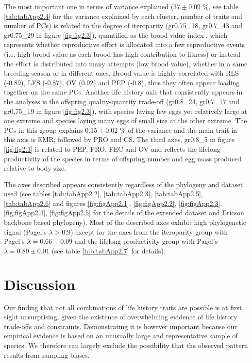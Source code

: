The most important one in terms of variance explained ($37 \pm 0.09$ \%, see
table \ref{tab:tabApp2.4} for the variance explained by each cluster, number
of traits and number of PCs) is related to the degree of iteroparity
(gr0.75\_18, gr0.7\_43 and gr0.75\_29 in figure \ref{fig:fig2.3}), quantified as
the brood value index \citep{Bokony2009}⁠, which represents whether reproductive
effort is allocated into a few reproductive events (i.e. high brood value as
each brood has high contribution to fitness) or instead the effort is
distributed into many attempts (low brood value), whether in a same breeding
season or in different ones. Brood value is highly correlated with RLS (-0.89),
LFS (-0.87), OV (0.92) and PEP (-0.8), thus they often appear loading
together on the same PCs.
Another life history axis that consistently appears in the analyses is the
offspring quality-quantity trade-off (gr0.8\_24, gr0.7\_17 and gr0.75\_19
in figure \ref{fig:fig2.3}), with species laying few eggs yet relatively large
at one extreme and species laying many eggs of small size at the other extreme.
The PCs in this group explains $0.15 \pm 0.02$ \% of the variance and the main
trait in this axis is EMR, followed by PRO and CS.
The third axes, gr0.8\_5 in figure \ref{fig:fig2.3} is related to PEP, PRO, FEC
and OV and reflects the lifelong productivity of the species in terms of
offspring number and egg mass produced relative to body size.

The axes described appears consistently regardless of the phylogeny and dataset
used (see tables \ref{tab:tabApp2.2}, \ref{tab:tabApp2.3}, \ref{tab:tabApp2.5},
\ref{tab:tabApp2.6} and figures \ref{fig:figApp2.1}, \ref{fig:figApp2.2},
\ref{fig:figApp2.3}, \ref{fig:figApp2.4}, \ref{fig:figApp2.5} for the details of
the extended dataset and Ericson backbone based phylogeny).
Most of the described axes exhibit high phylogenetic signal (Pagel's
$\lambda > 0.9$) except for the axes from the iteroparity group with Pagel's
$\lambda = 0.66 \pm 0.09$ and the lifelong productivity group with Pagel's
$\lambda = 0.89 \pm 0.01$ (see table \ref{tab:tabApp2.7} for details).


\section{Discussion}

Our finding that not all combinations of life history traits are possible is at 
first sight unsurprising, given the existence of overwhelming evidence of life 
history trade-offs and constraints. Demonstrating it is however important 
because our empirical evidence is based on an unusually large and representative 
sample of species. We therefore can largely exclude the possibility that the 
observed pattern results from sampling biases.

